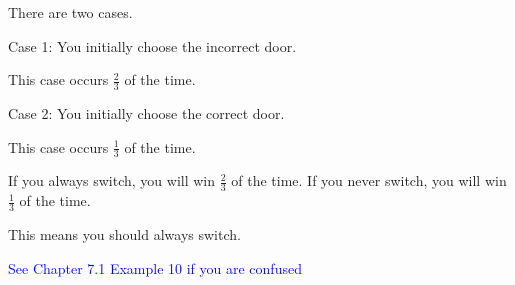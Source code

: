 \documentclass{exam}
\begin{document}
\begin{questions}
\begin{center}

There are two cases.
\vspace{10px}

Case 1: You initially choose the incorrect door.

This case occurs \(\frac{2}{3}\) of the time.
\vspace{10px}

Case 2: You initially choose the correct door.

This case occurs \(\frac{1}{3}\) of the time. 
\vspace{10px}

If you always switch, you will win \(\frac{2}{3}\) of the time. If you never switch, you will win \(\frac{1}{3}\) of the time.

This means you should always switch.

\textcolor{blue}{See Chapter 7.1 Example 10 if you are confused}

\end{center}

\end{questions}
\vspace{5px}
\begin{center} 
\end{center}
\end{document}
